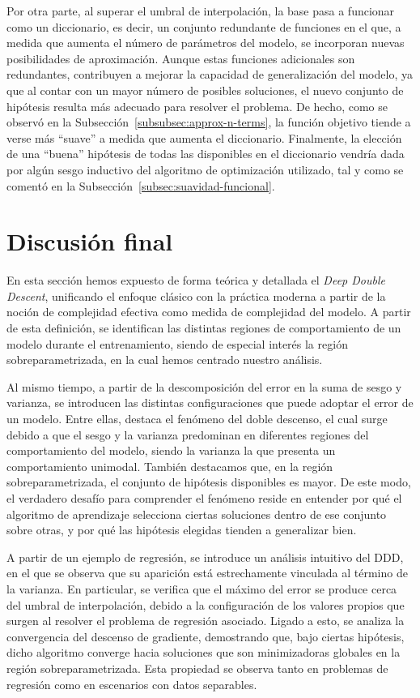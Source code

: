 Por otra parte, al superar el umbral de interpolación, la base pasa a funcionar como un diccionario, es decir, un conjunto redundante de funciones en el que, a medida que aumenta el número de parámetros del modelo, se incorporan nuevas posibilidades de aproximación. Aunque estas funciones adicionales son redundantes, contribuyen a mejorar la capacidad de generalización del modelo, ya que al contar con un mayor número de posibles soluciones, el nuevo conjunto de hipótesis resulta más adecuado para resolver el problema. De hecho, como se observó en la Subsección~\ref{subsubsec:approx-n-terms}, la función objetivo tiende a verse más “suave” a medida que aumenta el diccionario. Finalmente, la elección de una ``buena'' hipótesis de todas las disponibles en el diccionario vendría dada por algún sesgo inductivo del algoritmo de optimización utilizado, tal y como se comentó en la Subsección~\ref{subsec:suavidad-funcional}.

\section{Discusión final}\label{sec:conclusion-matematica}

En esta sección hemos expuesto de forma teórica y detallada el \textit{Deep Double Descent}, unificando el enfoque clásico con la práctica moderna a partir de la noción de complejidad efectiva como medida de complejidad del modelo. A partir de esta definición, se identifican las distintas regiones de comportamiento de un modelo durante el entrenamiento, siendo de especial interés la región sobreparametrizada, en la cual hemos centrado nuestro análisis.

Al mismo tiempo, a partir de la descomposición del error en la suma de sesgo y varianza, se introducen las distintas configuraciones que puede adoptar el error de un modelo. Entre ellas, destaca el fenómeno del doble descenso, el cual surge debido a que el sesgo y la varianza predominan en diferentes regiones del comportamiento del modelo, siendo la varianza la que presenta un comportamiento unimodal. También destacamos que, en la región sobreparametrizada, el conjunto de hipótesis disponibles es mayor. De este modo, el verdadero desafío para comprender el fenómeno reside en entender por qué el algoritmo de aprendizaje selecciona ciertas soluciones dentro de ese conjunto sobre otras, y por qué las hipótesis elegidas tienden a generalizar bien.

A partir de un ejemplo de regresión, se introduce un análisis intuitivo del DDD, en el que se observa que su aparición está estrechamente vinculada al término de la varianza. En particular, se verifica que el máximo del error se produce cerca del umbral de interpolación, debido a la configuración de los valores propios que surgen al resolver el problema de regresión asociado. Ligado a esto, se analiza la convergencia del descenso de gradiente, demostrando que, bajo ciertas hipótesis, dicho algoritmo converge hacia soluciones que son minimizadoras globales en la región sobreparametrizada. Esta propiedad se observa tanto en problemas de regresión como en escenarios con datos separables.

